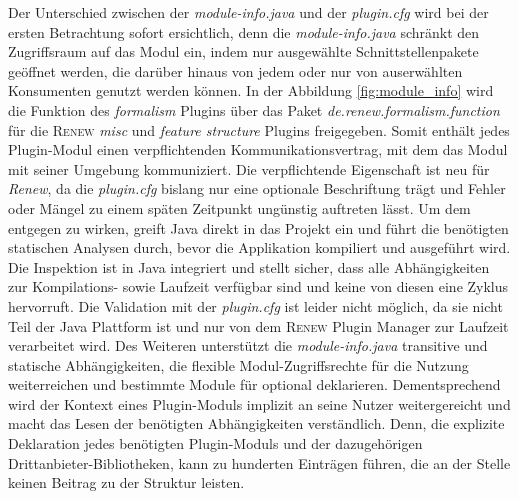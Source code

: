 			Der Unterschied zwischen der \textit{module-info.java} und der \textit{plugin.cfg} wird bei der ersten Betrachtung sofort ersichtlich, denn die \textit{module-info.java} schränkt den Zugriffsraum auf das Modul ein, indem nur ausgewählte Schnittstellenpakete geöffnet werden, die darüber hinaus von jedem oder nur von auserwählten Konsumenten genutzt werden können. In der Abbildung \ref{fig:module_info} wird die Funktion des \textit{formalism} Plugins über das Paket \textit{de.renew.formalism.function} für die \textsc{Renew} \textit{misc} und \textit{feature structure} Plugins freigegeben. \newline
			Somit enthält jedes Plugin-Modul einen verpflichtenden Kommunikationsvertrag, mit dem das Modul mit seiner Umgebung kommuniziert.\newline
			Die verpflichtende Eigenschaft ist neu für \textit{Renew}, da die \textit{plugin.cfg} bislang nur eine optionale Beschriftung trägt und Fehler oder Mängel zu einem späten Zeitpunkt ungünstig auftreten lässt. Um dem entgegen zu wirken, greift Java direkt in das Projekt ein und führt die benötigten statischen Analysen durch, bevor die Applikation kompiliert und ausgeführt wird. Die Inspektion ist in Java integriert und stellt sicher, dass alle Abhängigkeiten zur Kompilations- sowie Laufzeit verfügbar sind und keine von diesen eine Zyklus hervorruft.\newline
			Die Validation mit der \textit{plugin.cfg} ist leider nicht möglich, da sie nicht Teil der Java Plattform ist und nur von dem \textsc{Renew} Plugin Manager zur Laufzeit verarbeitet wird. Des Weiteren unterstützt die \textit{module-info.java} transitive und statische Abhängigkeiten, die flexible Modul-Zugriffsrechte für die Nutzung weiterreichen und bestimmte Module für optional deklarieren. Dementsprechend wird der Kontext eines Plugin-Moduls implizit an seine Nutzer weitergereicht und macht das Lesen der benötigten Abhängigkeiten verständlich. Denn, die explizite Deklaration jedes benötigten Plugin-Moduls und der dazugehörigen Drittanbieter-Bibliotheken, kann zu hunderten Einträgen führen, die an der Stelle keinen Beitrag zu der Struktur leisten. 


